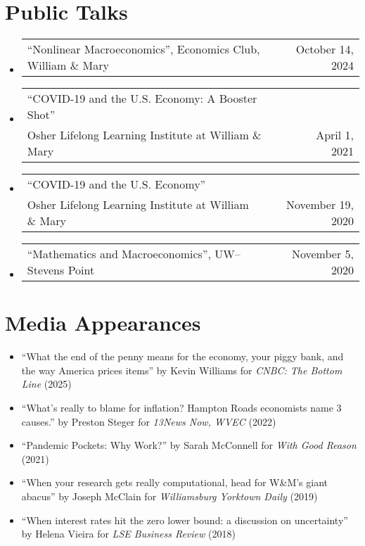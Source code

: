 \documentclass[10pt,letterpaper,en-US]{article}
\makeatletter
\newcommand{\itemrow}[2]
{\begin{tabular*}{\linewidth}{l@{\extracolsep{\fill}}r}
	#1 & #2 \\
\end{tabular*}}
\makeatother
\begin{document}
\section*{Public Talks}
\begin{itemize}
    \item \itemrow{``Nonlinear Macroeconomics'', Economics Club, William \& Mary}{October 14, 2024}
    \item \itemrow{``COVID-19 and the U.S. Economy: A Booster Shot'' \\ Osher Lifelong Learning Institute at William \& Mary}{April 1, 2021}
    \item \itemrow{``COVID-19 and the U.S. Economy'' \\ Osher Lifelong Learning Institute at William \& Mary}{November 19, 2020}
    \item \itemrow{``Mathematics and Macroeconomics'', UW--Stevens Point}{November 5, 2020}
\end{itemize}

\newpage
\section*{Media Appearances}
\begin{itemize}
    \item ``What the end of the penny means for the economy, your piggy bank, and the way America prices items'' by Kevin Williams for \emph{CNBC: The Bottom Line} (2025) 
    \item ``What's really to blame for inflation? Hampton Roads economists name 3 causes.'' by Preston Steger for \emph{13News Now, WVEC} (2022)
    \item ``Pandemic Pockets: Why Work{?}'' by Sarah McConnell for \emph{With Good Reason} (2021)
    \item ``When your research gets really computational, head for W\&M’s giant abacus'' by Joseph McClain for \emph{Williamsburg Yorktown Daily} (2019)
    \item ``When interest rates hit the zero lower bound: a discussion on uncertainty'' by Helena Vieira for \emph{LSE Business Review} (2018)
\end{itemize}
\end{document}
